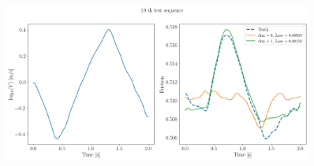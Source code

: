 \begin{figure}[H]
    \centering
    \includegraphics[width=0.9\textwidth]{images/dtTSqBurigede1204_2.png}
    \label{fig:dtTSqBurigedeJump1204_2}
\end{figure}

